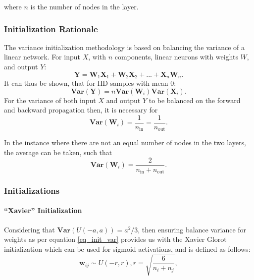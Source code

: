 \documentclass[a4paper,11pt,oneside]{article}
\newcommand{\Var}{\mathbf{Var}}
\theoremstyle{plain}
\theoremstyle{definition}
\begin{document}
	where $n$ is the number of nodes in the layer.
	
	\subsubsection{Initialization Rationale}
	
	The variance initialization methodology is based on balancing the variance of a linear network. For input $X$, with $n$ components, linear neurons with weights $W$, and output $Y$:
	\begin{equation}
	\mathbf{Y} = \mathbf{W}_1\mathbf{X}_1 + \mathbf{W}_2\mathbf{X}_2 + ... + \mathbf{X}_n\mathbf{W}_n .
	\end{equation}
	It can thus be shown, that for IID samples with mean $0$:
	\begin{equation}
	\mathbf{\Var(Y)} = n{\Var}(\mathbf{W}_i){\Var}(\mathbf{X}_i) .
	\end{equation}
	For the variance of both input $X$ and output $Y$ to be balanced on the forward and backward propagation then, it is necessary for
	\begin{equation}
	{\Var}(\mathbf{W}_i) = \frac{1}{n_{\mathrm{in}}}= \frac{1}{n_{\mathrm{out}}} .
	\end{equation}
	
	In the instance where there are not an equal number of nodes in the two layers, the average can be taken, such that
	\begin{equation}\label{eq_init_var}
	{\Var}(\mathbf{W}_i) = \frac{2}{n_{\mathrm{in}} + n_{\mathrm{out}}} .
	\end{equation}
	
	\subsubsection{Initializations}
	
	\paragraph{``Xavier'' Initialization} Considering that  $\Var(U(-a, a)) = a^2/3$, then ensuring balance variance for weights as per equation \eqref{eq_init_var} provides us with the Xavier Glorot initialization \citep{Glorot} which can be used for sigmoid activations, and is defined as follows:
	\begin{equation}
	\mathbf{w}_{ij} \sim U(-r, r), r = \sqrt{\frac{6}{n_i + n_j}} ,
	\end{equation}
	
\end{document}
